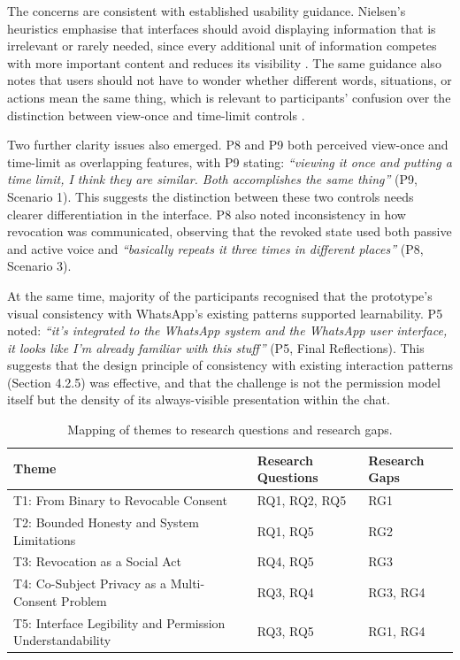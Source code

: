 The concerns are consistent with established usability guidance. Nielsen’s heuristics emphasise that interfaces should avoid displaying information that is irrelevant or rarely needed, since every additional unit of information competes with more important content and reduces its visibility \cite{nng_heuristics}. The same guidance also notes that users should not have to wonder whether different words, situations, or actions mean the same thing, which is relevant to participants’ confusion over the distinction between view-once and time-limit controls \cite{nng_heuristics}.

Two further clarity issues also emerged. P8 and P9 both perceived view-once and time-limit as overlapping features, with P9 stating: \textit{``viewing it once and putting a time limit, I think they are similar. Both accomplishes the same thing''} (P9, Scenario 1). This suggests the distinction between these two controls needs clearer differentiation in the interface. P8 also noted inconsistency in how revocation was communicated, observing that the revoked state used both passive and active voice and \textit{``basically repeats it three times in different places''} (P8, Scenario 3).

At the same time, majority of the participants recognised that the prototype's visual consistency with WhatsApp's existing patterns supported learnability. P5 noted: \textit{``it's integrated to the WhatsApp system and the WhatsApp user interface, it looks like I'm already familiar with this stuff''} (P5, Final Reflections). This suggests that the design principle of consistency with existing interaction patterns (Section 4.2.5) was effective, and that the challenge is not the permission model itself but the density of its always-visible presentation within the chat.

\begin{table}[H]
    \centering
    \small
    \begin{tabular}{|p{4.5cm}|p{3.2cm}|p{2.8cm}|}
    \hline
    \textbf{Theme} & \textbf{Research Questions} & \textbf{Research Gaps} \\
    \hline
    T1: From Binary to Revocable Consent & RQ1, RQ2, RQ5 & RG1 \\
    \hline
    T2: Bounded Honesty and System Limitations & RQ1, RQ5 & RG2 \\
    \hline
    T3: Revocation as a Social Act & RQ4, RQ5 & RG3 \\
    \hline
    T4: Co-Subject Privacy as a Multi-Consent Problem & RQ3, RQ4 & RG3, RG4 \\
    \hline
    T5: Interface Legibility and Permission Understandability & RQ3, RQ5 & RG1, RG4 \\
    \hline
    \end{tabular}
    \caption{Mapping of themes to research questions and research gaps.}
    \label{tab:theme-rq}
    \end{table}

